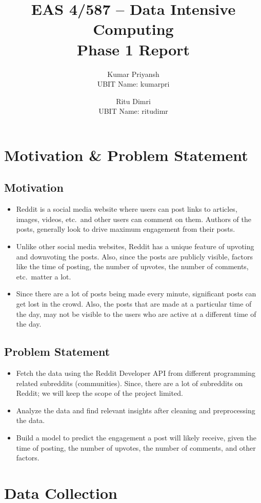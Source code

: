 \documentclass[12pt, letterpage]{article}
\title{EAS 4/587 – Data Intensive Computing\\Phase 1 Report}
\author{
    Kumar Priyansh \\
    \footnotesize UBIT Name: kumarpri
    \and Ritu Dimri\\
    \footnotesize UBIT Name: ritudimr
}
\date{}
\begin{document}
\maketitle

\section{Motivation \& Problem Statement}

\subsection{Motivation}
\begin{itemize}
    \item Reddit is a social media website where users can post links to articles, images, videos, etc.\ and other users can comment on them. Authors of the posts, generally look to drive maximum engagement from their posts.
    \item Unlike other social media websites, Reddit has a unique feature of upvoting and downvoting the posts. Also, since the posts are publicly visible, factors like the time of posting, the number of upvotes, the number of comments, etc.\ matter a lot.
    \item Since there are a lot of posts being made every minute, significant posts can get lost in the crowd. Also, the posts that are made at a particular time of the day, may not be visible to the users who are active at a different time of the day.
\end{itemize}

\subsection{Problem Statement}
\begin{itemize}
    \item Fetch the data using the Reddit Developer API from different programming related subreddits (communities). Since, there are a lot of subreddits on Reddit; we will keep the scope of the project limited.
    \item Analyze the data and find relevant insights after cleaning and preprocessing the data.
    \item Build a model to predict the engagement a post will likely receive, given the time of posting, the number of upvotes, the number of comments, and other factors.
\end{itemize}

\section{Data Collection}
\end{document}
